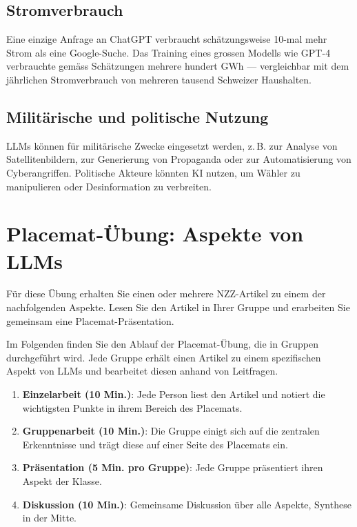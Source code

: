 \subsection{Stromverbrauch}

\begin{myexample}
    Eine einzige Anfrage an ChatGPT verbraucht schätzungsweise 10-mal mehr Strom
    als eine Google-Suche. Das Training eines grossen Modells wie GPT-4 verbrauchte
    gemäss Schätzungen mehrere hundert GWh --- vergleichbar mit dem jährlichen
    Stromverbrauch von mehreren tausend Schweizer Haushalten.
\end{myexample}

\subsection{Militärische und politische Nutzung}
\begin{myremark}
    LLMs können für militärische Zwecke eingesetzt werden, z.\,B. zur Analyse von
    Satellitenbildern, zur Generierung von Propaganda oder zur Automatisierung von
    Cyberangriffen. Politische Akteure könnten KI nutzen, um Wähler zu manipulieren
    oder Desinformation zu verbreiten.
\end{myremark}

\section{Placemat-Übung: Aspekte von LLMs}

\begin{myattention}
    Für diese Übung erhalten Sie einen oder mehrere NZZ-Artikel zu einem der
    nachfolgenden Aspekte. Lesen Sie den Artikel in Ihrer Gruppe und erarbeiten
    Sie gemeinsam eine Placemat-Präsentation.
\end{myattention}

\begin{myprocedure}
    Im Folgenden finden Sie den Ablauf der Placemat-Übung, die in Gruppen durchgeführt wird. Jede Gruppe erhält einen Artikel zu einem spezifischen Aspekt von LLMs und bearbeitet diesen anhand von Leitfragen.
    \begin{enumerate}
        \item \textbf{Einzelarbeit (10 Min.)}: Jede Person liest den Artikel und
              notiert die wichtigsten Punkte in ihrem Bereich des Placemats.
        \item \textbf{Gruppenarbeit (10 Min.)}: Die Gruppe einigt sich auf die
              zentralen Erkenntnisse und trägt diese auf einer Seite des Placemats ein.
        \item \textbf{Präsentation (5 Min. pro Gruppe)}: Jede Gruppe präsentiert
              ihren Aspekt der Klasse.
        \item \textbf{Diskussion (10 Min.)}: Gemeinsame Diskussion über alle Aspekte, Synthese in der Mitte.
    \end{enumerate}
\end{myprocedure}

